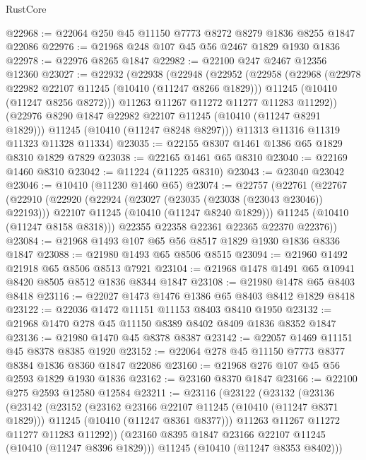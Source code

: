 \begin{lexlean}{RustCore}
\begin{coremodule}
@22968 := @22064 @250 @45 @11150 @7773 @8272 @8279 @1836 @8255 @1847 @22086
@22976 := @21968 @248 @107 @45 @56 @2467 @1829 @1930 @1836
@22978 := @22976 @8265 @1847
@22982 := @22100 @247 @2467 @12356 @12360
@23027 := @22932
    (@22938
      (@22948
        (@22952
          (@22958
            (@22968
              (@22978 @22982 @22107 @11245 (@10410 (@11247 @8266 @1829)))
              @11245
              (@10410 (@11247 @8256 @8272)))
            @11263
            @11267
            @11272
            @11277
            @11283
            @11292))
        (@22976 @8290 @1847 @22982 @22107 @11245 (@10410 (@11247 @8291 @1829)))
        @11245
        (@10410 (@11247 @8248 @8297)))
      @11313
      @11316
      @11319
      @11323
      @11328
      @11334)
@23035 := @22155 @8307 @1461 @1386 @65 @1829 @8310 @1829 @7829
@23038 := @22165 @1461 @65 @8310
@23040 := @22169 @1460 @8310
@23042 := @11224 (@11225 @8310)
@23043 := @23040 @23042
@23046 := @10410 (@11230 @1460 @65)
@23074 := @22757
    (@22761
      (@22767
        (@22910
          (@22920
            (@22924 (@23027 (@23035 (@23038 (@23043 @23046)) @22193)))
            @22107
            @11245
            (@10410 (@11247 @8240 @1829)))
          @11245
          (@10410 (@11247 @8158 @8318)))
        @22355
        @22358
        @22361
        @22365
        @22370
        @22376))
@23084 := @21968 @1493 @107 @65 @56 @8517 @1829 @1930 @1836 @8336 @1847
@23088 := @21980 @1493 @65 @8506 @8515
@23094 := @21960 @1492 @21918 @65 @8506 @8513 @7921
@23104 := @21968 @1478 @1491 @65 @10941 @8420 @8505 @8512 @1836 @8344 @1847
@23108 := @21980 @1478 @65 @8403 @8418
@23116 := @22027 @1473 @1476 @1386 @65 @8403 @8412 @1829 @8418
@23122 := @22036 @1472 @11151 @11153 @8403 @8410 @1950
@23132 := @21968 @1470 @278 @45 @11150 @8389 @8402 @8409 @1836 @8352 @1847
@23136 := @21980 @1470 @45 @8378 @8387
@23142 := @22057 @1469 @11151 @45 @8378 @8385 @1920
@23152 := @22064 @278 @45 @11150 @7773 @8377 @8384 @1836 @8360 @1847 @22086
@23160 := @21968 @276 @107 @45 @56 @2593 @1829 @1930 @1836
@23162 := @23160 @8370 @1847
@23166 := @22100 @275 @2593 @12580 @12584
@23211 := @23116
    (@23122
      (@23132
        (@23136
          (@23142
            (@23152
              (@23162 @23166 @22107 @11245 (@10410 (@11247 @8371 @1829)))
              @11245
              (@10410 (@11247 @8361 @8377)))
            @11263
            @11267
            @11272
            @11277
            @11283
            @11292))
        (@23160 @8395 @1847 @23166 @22107 @11245 (@10410 (@11247 @8396 @1829)))
        @11245
        (@10410 (@11247 @8353 @8402)))

\end{coremodule}
\end{lexlean}
